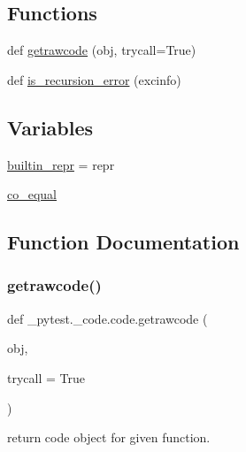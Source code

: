 \subsection*{Functions}
\begin{DoxyCompactItemize}
\item 
def \hyperlink{namespace__pytest_1_1__code_1_1code_a686a3d8bab35bb830871cf2246a99308}{getrawcode} (obj, trycall=True)
\item 
def \hyperlink{namespace__pytest_1_1__code_1_1code_a7ee7dd239e2324c4bfd03cc7c6e38a18}{is\+\_\+recursion\+\_\+error} (excinfo)
\end{DoxyCompactItemize}
\subsection*{Variables}
\begin{DoxyCompactItemize}
\item 
\hyperlink{namespace__pytest_1_1__code_1_1code_a2e7c6c7b34f9427778cd1fb764c077e7}{builtin\+\_\+repr} = repr
\item 
\hyperlink{namespace__pytest_1_1__code_1_1code_a75b7707545f34e33c24d152a4e48e09f}{co\+\_\+equal}
\end{DoxyCompactItemize}


\subsection{Function Documentation}
\mbox{\label{namespace__pytest_1_1__code_1_1code_a686a3d8bab35bb830871cf2246a99308}} 
\subsubsection{\texorpdfstring{getrawcode()}{getrawcode()}}
{\footnotesize\ttfamily def \+\_\+pytest.\+\_\+code.\+code.\+getrawcode (\begin{DoxyParamCaption}\item[{}]{obj,  }\item[{}]{trycall = {\ttfamily True} }\end{DoxyParamCaption})}

\begin{DoxyVerb}return code object for given function. \end{DoxyVerb}
 \mbox{\label{namespace__pytest_1_1__code_1_1code_a7ee7dd239e2324c4bfd03cc7c6e38a18}} 
